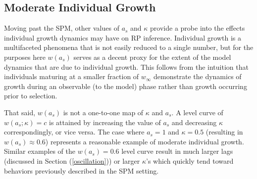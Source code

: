 %
\subsection{Moderate Individual Growth\label{medium}}

%
Moving past the SPM, other values of $a_s$ and $\kappa$ provide a probe into 
the effects individual growth dynamics may have on RP inference.
%
Individual growth is a multifaceted phenomena that is not easily reduced
to a single number, but for the purposes here $w(a_s)$ serves as a decent 
proxy for the extent of the model dynamics that are due to individual growth. %
%
This follows from the intuition that individuals maturing at a smaller fraction
of $w_\infty$ demonstrate the dynamics of growth during an observable (to the model) %
phase rather than growth occurring prior to selection. %

%
That said, $w(a_s)$ is not a one-to-one map of $\kappa$ and $a_s$.
%
A level curve of $w(a_s; \kappa)=c$ is attained by increasing the value of $a_s$
and decreasing $\kappa$ correspondingly, or vice versa.
%
The case where $a_s=1$ and $\kappa=0.5$ (resulting in $w(a_s)\approx0.6$)
represents a reasonable example of moderate individual growth.
%
Similar examples of the $w(a_s)=0.6$ level curve result in much larger lags
(discussed in Section (\ref{oscillation})) or larger $\kappa$'s which quickly
tend toward behaviors previously described in the SPM setting.

